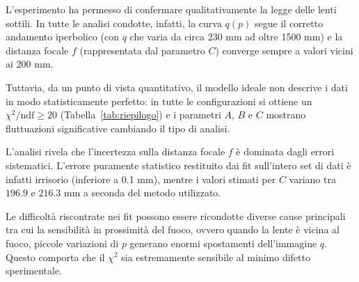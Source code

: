 \documentclass[10pt,twocolumn]{article}
\begin{document}
\noindent L'esperimento ha permesso di confermare qualitativamente la legge delle lenti sottili. In tutte le analisi condotte, infatti, la curva $q(p)$ segue il corretto andamento iperbolico (con $q$ che varia da circa 230 mm ad oltre 1500 mm) e la distanza focale $f$ (rappresentata dal parametro $C$) converge sempre a valori vicini ai 200 mm. 

\noindent Tuttavia, da un punto di vista quantitativo, il modello ideale non descrive i dati in modo statisticamente perfetto: in tutte le configurazioni si ottiene un $\chi^2/\mathrm{ndf}\geq 20$ (Tabella~\ref{tab:riepilogo}) e i parametri $A$, $B$ e $C$ mostrano fluttuazioni significative cambiando il tipo di analisi.

\begin{table}[h]
    \centering
    \small
    \caption{Riepilogo delle analisi.}
    \label{tab:riepilogo}
\end{table}


\noindent L'analisi rivela che l'incertezza sulla distanza focale $f$ è dominata dagli errori sistematici. L'errore puramente statistico restituito dai fit sull'intero set di dati è infatti irrisorio (inferiore a 0.1 mm), mentre i valori stimati per $C$ variano tra $196.9$ e $216.3$ mm a seconda del metodo utilizzato. 

\noindent Le difficoltà riscontrate nei fit possono essere ricondotte diverse cause principali tra cui
la sensibilità in prossimità del fuoco, ovvero quando la lente è vicina al fuoco, piccole variazioni di $p$ generano enormi spostamenti dell'immagine $q$. Questo comporta che il $\chi^2$ sia estremamente sensibile al minimo difetto sperimentale.
\end{document}
